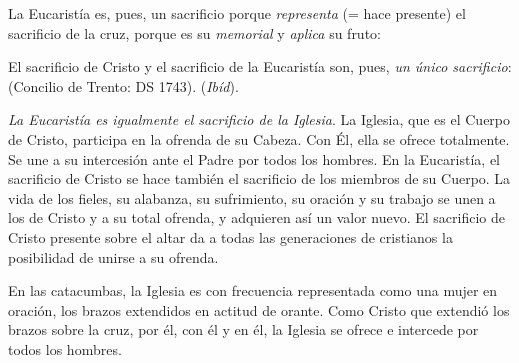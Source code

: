 \begin{ccebody}
\newpage 
{} La Eucaristía es, pues, un sacrificio porque \textit{representa} (= hace presente) el sacrificio de la cruz, porque es su \textit{memorial} y \textit{aplica} su fruto:


 El sacrificio de Cristo y el sacrificio de la Eucaristía son, pues, \textit{un único sacrificio}:  (Concilio de Trento: DS 1743).  (\textit{Ibíd}).

 \textit{La Eucaristía es igualmente el sacrificio de la Iglesia}. La Iglesia, que es el Cuerpo de Cristo, participa en la ofrenda de su Cabeza. Con Él, ella se ofrece totalmente. Se une a su intercesión ante el Padre por todos los hombres. En la Eucaristía, el sacrificio de Cristo se hace también el sacrificio de los miembros de su Cuerpo. La vida de los fieles, su alabanza, su sufrimiento, su oración y su trabajo se unen a los de Cristo y a su total ofrenda, y adquieren así un valor nuevo. El sacrificio de Cristo presente sobre el altar da a todas las generaciones de cristianos la posibilidad de unirse a su ofrenda.

En las catacumbas, la Iglesia es con frecuencia representada como una mujer en oración, los brazos extendidos en actitud de orante. Como Cristo que extendió los brazos sobre la cruz, por él, con él y en él, la Iglesia se ofrece e intercede por todos los hombres.


\end{ccebody}
